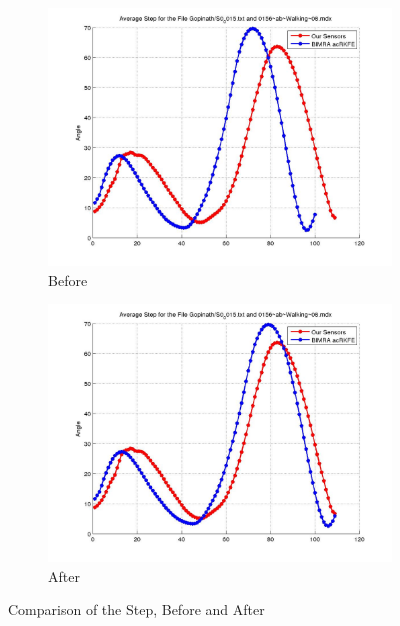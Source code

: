 \documentclass[12pt]{article}
\begin{document}
\begin{figure}[h]%

\begin{subfigure}[!htb]{2cm}
\hspace*{-2cm} \includegraphics[scale=.22]{S0_0015_before.jpg}
\caption{Before}
\end{subfigure}
\hfill\hfill
\begin{subfigure}[h]{0.4\textwidth}
\hspace*{-2cm} \includegraphics[scale=.22]{S0_0015_after.jpg}
\caption{After}
\end{subfigure}%

\caption[Hello]{Comparison of the Step, Before and After}
\end{figure}
\end{document}

